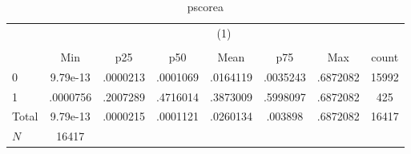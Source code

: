 \begin{table}[htbp]\centering
\def\sym#1{\ifmmode^{#1}\else\(^{#1}\)\fi}
\caption{pscorea}
\begin{tabular}{l*{1}{ccccccc}}
\hline\hline
          &\multicolumn{7}{c}{(1)}                                              \\
          &\multicolumn{7}{c}{}                                                 \\
          &      Min&      p25&      p50&     Mean&      p75&      Max&    count\\
\hline
0         & 9.79e-13& .0000213& .0001069& .0164119& .0035243& .6872082&    15992\\
1         & .0000756& .2007289& .4716014& .3873009& .5998097& .6872082&      425\\
Total     & 9.79e-13& .0000215& .0001121& .0260134&  .003898& .6872082&    16417\\
\hline
\(N\)     &    16417&         &         &         &         &         &         \\
\hline\hline
\end{tabular}
\end{table}
